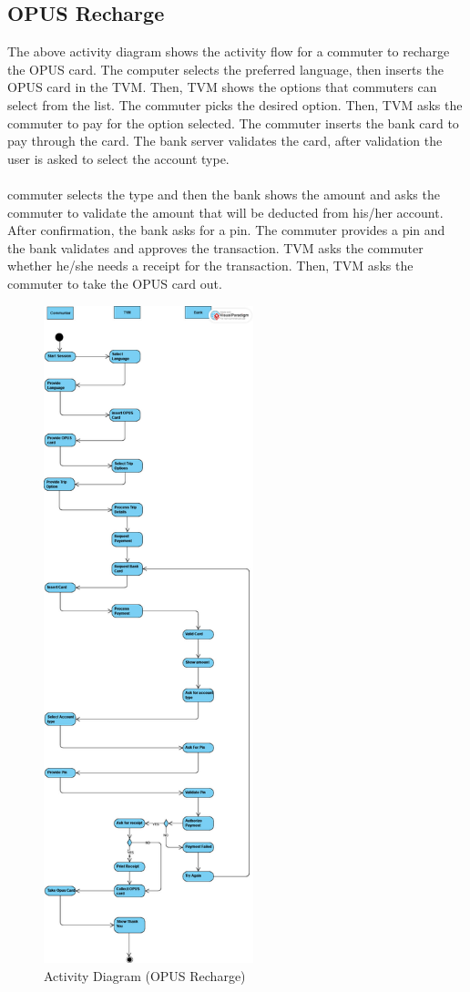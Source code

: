 \documentclass{article}
\begin{document}
{\subsection{OPUS Recharge}
The above activity diagram shows the activity flow for a commuter to recharge the OPUS card. The computer selects the preferred language, then inserts the OPUS card in the TVM. Then, TVM shows the options that commuters can select from the list. The commuter picks the desired option. Then, TVM asks the commuter to pay for the option selected. The commuter inserts the bank card to pay through the card. The bank server validates the card, after validation the user is asked to select the account type. 
\\\
\\\The commuter selects the type and then the bank shows the amount and asks the commuter to validate the amount that will be deducted from his/her account. After confirmation, the bank asks for a pin. The commuter provides a pin and the bank validates and approves the transaction. TVM asks the commuter whether he/she needs a receipt for the transaction. Then, TVM asks the commuter to take the OPUS card out.
\begin{figure}[!p]
    \begin{center}
        \includegraphics[width=2.4in]{Activity Diagram (OPUS).jpg}
        \caption{Activity Diagram (OPUS Recharge)}
    \end{center}
\end{figure}
}
\end{document}
